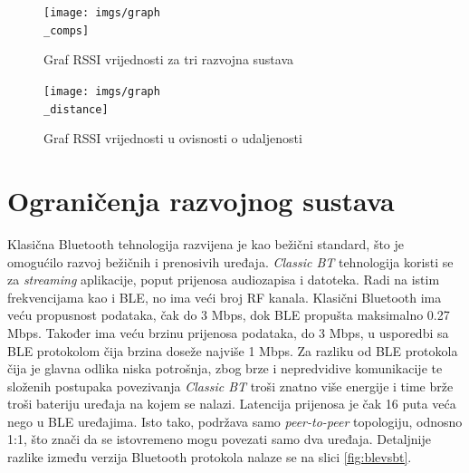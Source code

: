 \begin{figure}[ht]
	\begin{minipage}[t]{0.4\textwidth}
		\texttt{[image: imgs/graph\\\_comps]}
		\caption{Graf RSSI vrijednosti za tri razvojna sustava}
		\label{fig:graph_comps}
	\end{minipage}
	\hspace*{\fill}
	\begin{minipage}[t]{0.4\textwidth}
		\texttt{[image: imgs/graph\\\_distance]}
		\caption{Graf RSSI vrijednosti u ovisnosti o udaljenosti}
		\label{fig:graph_distance}
	\end{minipage}
\end{figure}


\section{Ograničenja razvojnog sustava}

Klasična Bluetooth tehnologija razvijena je kao bežični standard, što je omogućilo razvoj bežičnih i prenosivih uređaja. \textit{Classic BT} tehnologija koristi se za \textit{streaming} aplikacije, poput prijenosa audiozapisa i datoteka. Radi na istim frekvencijama kao i BLE, no ima veći broj RF kanala. Klasični Bluetooth ima veću propusnost podataka, čak do 3 Mbps, dok BLE propušta maksimalno 0.27 Mbps. Također ima veću brzinu prijenosa podataka, do 3 Mbps, u usporedbi sa BLE protokolom čija brzina doseže najviše 1 Mbps. Za razliku od BLE protokola čija je glavna odlika niska potrošnja,  zbog brze i nepredvidive komunikacije te složenih postupaka povezivanja \textit{Classic BT} troši znatno više energije i time brže troši bateriju uređaja na kojem se nalazi. Latencija prijenosa je čak 16 puta veća nego u BLE uređajima. Isto tako, podržava samo \textit{peer-to-peer} topologiju, odnosno 1:1, što znači da se istovremeno mogu povezati samo dva uređaja. Detaljnije razlike između verzija Bluetooth protokola nalaze se na slici \ref{fig:blevsbt}. \cite{blevsbt}

